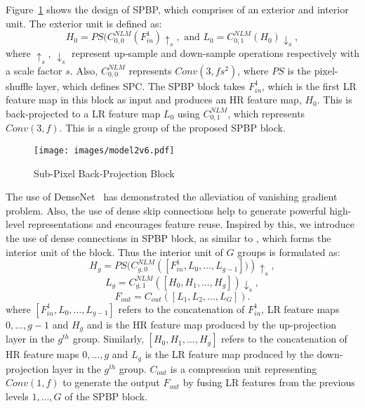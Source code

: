 \documentclass[a4paper,11pt]{article}
\begin{document}
Figure~\ref{fig:SPBP} shows the design of SPBP, which comprises of an exterior and interior unit.
The exterior unit is defined as:
  \begin{equation}
     {H}_{0} = {PS}({C}_{0,0}^{NLM}({F}_{in}^{1})\uparrow_{s}, 
\text{ and } 
{L}_{0} = {C}_{0,1}^{NLM}({H}_{0}) \downarrow_{s},
 \end{equation}
 where $\uparrow_{s}$, $\downarrow_{s}$ represent up-sample and down-sample operations respectively with a scale factor $s$. Also, ${C}_{0,0}^{NLM}$ represents $Conv(3, fs^2)$, where ${PS}$ is the pixel-shuffle layer, which defines SPC. The SPBP block takes ${F}_{in}^{1}$, which is the first LR feature map in this block as input and produces an HR feature map, ${H}_{0}$. This is back-projected to a LR feature map ${L}_{0}$ using ${C}_{0,1}^{NLM}$, which represents $Conv(3, f)$. This is a single group of the proposed SPBP block. 
 






\begin{figure}[ht]
     \centering
     \texttt{[image: images/model2v6.pdf]}
\caption{ Sub-Pixel Back-Projection Block }
\label{fig:SPBP}
\end{figure}

The use of DenseNet~\cite{densenet} has demonstrated the alleviation of vanishing gradient problem. Also, the use of dense skip connections help to generate powerful high-level representations and encourages feature reuse. Inspired by this, we introduce the use of dense connections in SPBP block, as similar to \cite{DBPN}, which forms the interior unit of the block. Thus the interior unit of $G$ groups is formulated as:
\begin{equation}
    {H}_{g}={PS}({C}_{g,0}^{NLM}\left(\left[{F}_{in}^{1}, {L}_{0}, \ldots, {L}_{g-1}\right])\right)\uparrow_{s},
\end{equation}
\begin{equation}
    {L}_{g}={C}_{g,1}^{NLM}\left(\left[{H}_{0}, {H}_{1}, \ldots, {H}_{g}\right]\right) \downarrow_{s},
\end{equation}
\begin{equation}
    {F}_{out}={C}_{out}\left(\left[{L}_{1}, {L}_{2}, \ldots, {L}_{G}\right]\right).
\end{equation}
where $[{F}_{in}^{1}, {L}_{0}, \ldots, {L}_{g-1}]$ refers to the concatenation of ${F}_{in}^{1}$, LR feature maps $0,...,g-1$ and  ${H}_{g}$ and is the HR feature map produced by the up-projection layer in the $g^{th}$ group. Similarly, $[{H}_{0}, {H}_{1}, \ldots, {H}_{g}]$ refers to the concatenation of HR feature maps  $0,...,g$ and  ${L}_{g}$ is the LR feature map produced by the down-projection layer in the $g^{th}$ group. ${C}_{out}$ is a compression unit representing $Conv(1, f)$ to generate the output ${F}_{out}$ by fusing LR features from the previous levels $1,...,G$ of the SPBP block.
\end{document}
